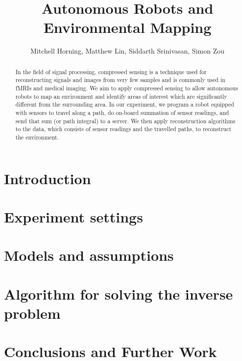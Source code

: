 \documentclass[english]{article}\usepackage[]{graphicx}\usepackage[]{color}
\begin{document}
\title{Autonomous Robots and Environmental Mapping}

\author{Mitchell Horning, Matthew Lin, Siddarth Srinivasan, Simon Zou}

\maketitle

\begin{abstract}

In the field of signal processing, compressed sensing is a technique used for 
reconstructing signals and images from very few samples and is commonly used in 
fMRIs and medical imaging. We aim to apply compressed sensing to allow 
autonomous robots to map an environment and identify areas of interest which 
are significantly different from the surrounding area. In our experiment, we 
program a robot equipped with sensors to travel along a path, do on-board 
summation of sensor readings, and send that sum (or path integral) to a 
server. We then apply reconstruction algorithms to the data, which consists of sensor readings 
and the travelled paths, to reconstruct the environment.

\end{abstract}

\tableofcontents


\section{Introduction}

\section{Experiment settings}

\section{Models and assumptions}

\section{Algorithm for solving the inverse problem}

\section{Conclusions and Further Work}
\end{document}
